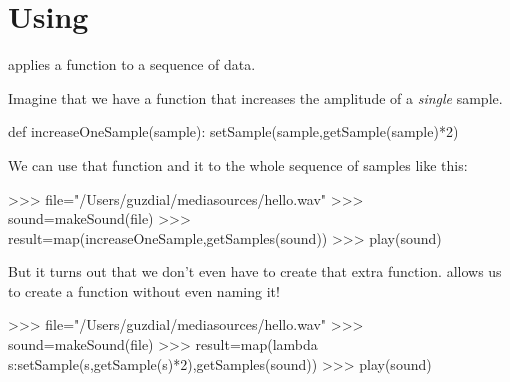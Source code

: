 



\section{Using }

	 applies a function to a sequence of data.

Imagine that we have a function  that increases the amplitude of a \emph{single} sample.
\begin{example}
def increaseOneSample(sample):
  setSample(sample,getSample(sample)*2)

\end{example}

We can use that function and  it to the whole sequence of samples like this:
\begin{example}
>>> file="/Users/guzdial/mediasources/hello.wav"
>>> sound=makeSound(file)
>>> result=map(increaseOneSample,getSamples(sound))
>>> play(sound)
\end{example}

But it turns out that we don't even have to create that extra function.   allows us to create a function without even naming it!

\begin{example}
>>> file="/Users/guzdial/mediasources/hello.wav"
>>> sound=makeSound(file)
>>> result=map(lambda s:setSample(s,getSample(s)*2),getSamples(sound))
>>> play(sound)
\end{example}





	

